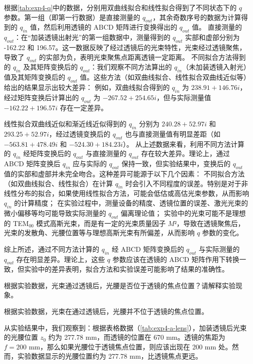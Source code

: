 根据\cref{tab:exp4-q}中的数据，分别用双曲线拟合和线性拟合得到了不同状态下的 \( q \) 参数。第一组（即第一行数据）是直接测量的 \( q_{out} \)，其余奇数序号的数据为计算得到的 \( q_{in} \) 值，然后利用透镜的 ABCD 矩阵进行变换得出的 \( q_{out} \) 值。
直接测量的 \( q_{out} \)：在“加装透镜出射光”的第一组数据中，测量得到的 \( q_{out} \) 实部和虚部分别为 -162.22 和 196.57。这一数据反映了经过透镜后的光束特性，光束经过透镜聚焦，导致了 \( q_{out} \) 的实部为负，表明光束聚焦点距离透镜一定距离。
不同拟合方法得到的 \( q_{in} \) 及其矩阵变换后的 \( q_{out} \)：我们观察不同方法算出的 \( q_{in} \)（未加装透镜入射光）值及其矩阵变换后的 \( q_{out} \) 值。这些方法（如双曲线拟合、线性拟合双曲线近似等）给出的结果显示出较大差异：
例如，双曲线拟合得到的 \( q_{in} \) 为 \( 238.91 + 146.76i \)，经过矩阵变换后计算出的 \( q_{out} \) 为 \( -267.52 + 254.65i \)，但与实际测量值 \( -162.22 + 196.57i \) 存在一定差异。

线性拟合双曲线近似和渐近线近似得到的 \( q_{in} \) 分别为 \( 240.28 + 52.97i \) 和 \( 293.25 + 52.97i \)，经过透镜变换后的 \( q_{out} \) 也与直接测量值有明显差距（如 \( -563.81 + 478.49i \) 和 \( -524.30 + 184.23i \)）。
从上述数据来看，利用不同方法计算的 \( q_{in} \) 经矩阵变换后的 \( q_{out} \) 与直接测量的 \( q_{out} \) 存在较大差异。理论上，通过 ABCD 矩阵变换后 \( q_{in} \) 应与实际的 \( q_{out} \) 保持一致，但实验结果中，变换后的 \( q_{out} \) 值的实部和虚部并未完全吻合。这种差异可能源于以下几个因素：
不同拟合方法（如双曲线拟合、线性拟合）在计算 \( q_{in} \) 时会引入不同程度的误差。特别是对于非线性分布的拟合，如果使用线性拟合方法，可能会低估或高估光束参数，从而影响 \( q_{in} \) 的计算精度；
在实验过程中，测量设备的精度、透镜位置的误差、激光光束的微小偏移等均可能导致实际测量的 \( q_{out} \) 偏离理论值；
实验中的光束可能不是理想的 TEM\(_{00}\) 模式高斯光束，而是有一定的光束质量因子 \( M² \)，导致在透镜聚焦后，光束的发散角、光腰位置等与理想高斯光束有所偏差，从而影响 \( q \) 参数的变化。

综上所述，通过不同方法计算的 \( q_{in} \) 经 ABCD 矩阵变换后的 \( q_{out} \) 与实际测量的 \( q_{out} \) 存在明显差异。理论上，这些 \( q \) 参数应该在透镜的 ABCD 矩阵作用下转换一致，但实验中的差异表明，拟合方法和实验误差可能影响了结果的准确性。


\begin{question}
	根据实验数据，光束通过透镜后，光腰是否位于透镜的焦点位置？请解释实验现象。
\end{question}
根据实验数据，光束在通过透镜后，光腰并不位于透镜的焦点位置。

从实验结果中，我们观察到：根据表格数据（\cref{tab:exp4-a-lens}），加装透镜后光束的光腰位置 \( z_0 \) 约为 277.78 mm，而透镜的位置在 670 mm。透镜的焦距为 \( f = 200 \) mm，那么如果光腰位于透镜焦点位置，则应该出现在 200 mm 处。然而，实验数据显示的光腰位置约为 277.78 mm，比透镜焦点更远。

